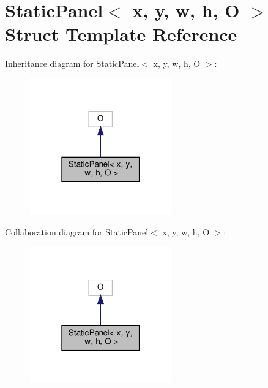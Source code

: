 \hypertarget{structStaticPanel}{}\section{Static\+Panel$<$ x, y, w, h, O $>$ Struct Template Reference}
\label{structStaticPanel}


Inheritance diagram for Static\+Panel$<$ x, y, w, h, O $>$\+:\nopagebreak
\begin{figure}[H]
\begin{center}
\leavevmode
\includegraphics[width=175pt]{structStaticPanel__inherit__graph}
\end{center}
\end{figure}


Collaboration diagram for Static\+Panel$<$ x, y, w, h, O $>$\+:\nopagebreak
\begin{figure}[H]
\begin{center}
\leavevmode
\includegraphics[width=175pt]{structStaticPanel__coll__graph}
\end{center}
\end{figure}
